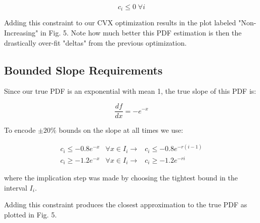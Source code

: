 \documentclass[a4paper]{article}
\begin{document}
\begin{equation}
  c_i \leq 0 \; \forall i
\end{equation}

Adding this constraint to our CVX optimization results in the plot labeled "Non-Increasing" in Fig. 5.
Note how much better this PDF estimation is then the drastically over-fit "deltas" from the previous optimization.

\subsection{Bounded Slope Requirements}
Since our true PDF is an exponential with mean 1, the true slope of this PDF is:

$$
\frac{df}{dx} = -e^{-x}
$$

To encode $\pm 20\%$ bounds on the slope at all times we use:

\begin{equation}
  \begin{aligned}
    c_i \leq -0.8 e^{-x} & \forall x \in I_i \rightarrow & c_i \leq -0.8 e^{-r(i-1)} \\
    c_i \geq -1.2 e^{-x} & \forall x \in I_i \rightarrow & c_i \geq -1.2 e^{-ri}
  \end{aligned}
\end{equation}

where the implication step was made by choosing the tightest bound in the interval $I_i$.

Adding this constraint produces the closest approximation to the true PDF as plotted in Fig. 5.
\end{document}
